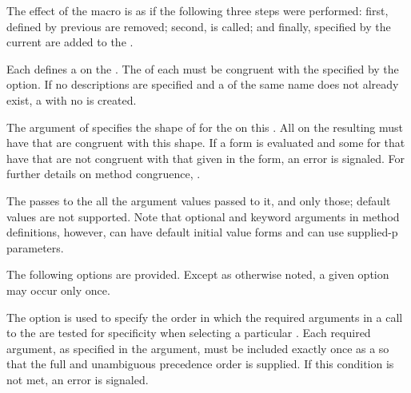 The effect of the  macro is as if the following three
steps were performed: first, 
 defined by previous   are removed; 
second, 
is called; and finally,  specified by the current
  are added to the . 
 
Each  defines a  on the .
The  of each  must be congruent with the 
specified by the  option.  
If no  descriptions are specified and a  of the same
name does not already exist, a  with no 
 is created.
 
The  argument of  specifies the shape of
 for the  on this .
All  on the resulting 
 must have
 that are congruent with this shape.  If a 
form is evaluated and some 
 for that 
have  that are not congruent with that given in
the  form, an error is signaled.  For further details
on method congruence, \seesection\GFMethodLambdaListCongruency.
 
The  passes to the 
 all the argument values passed to
it, and only those; default values are not supported.
Note that optional and keyword arguments in method definitions, however,
can have default initial value forms and can use supplied-p parameters. 
 
The following options are provided.  
Except as otherwise noted, 
a given option may occur only once.
 
\beginlist
 
\itemitem{\bull} 
The  option is used to specify the
order in which the required arguments in a call to the 
are tested for specificity when selecting a particular
. Each required argument, as specified in the 
argument, must be included exactly once as a 
so that the full and unambiguous precedence order is
supplied.  If this condition is not met, an error is signaled.
 

